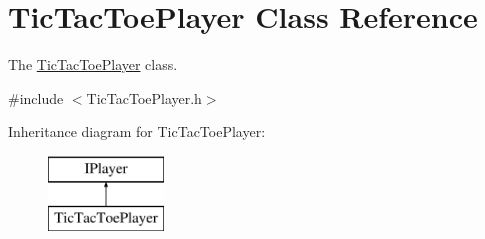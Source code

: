 \hypertarget{class_tic_tac_toe_player}{}\section{Tic\+Tac\+Toe\+Player Class Reference}
\label{class_tic_tac_toe_player}


The \hyperlink{class_tic_tac_toe_player}{Tic\+Tac\+Toe\+Player} class.  




{\ttfamily \#include $<$Tic\+Tac\+Toe\+Player.\+h$>$}

Inheritance diagram for Tic\+Tac\+Toe\+Player\+:\begin{figure}[H]
\begin{center}
\leavevmode
\includegraphics[height=2.000000cm]{class_tic_tac_toe_player}
\end{center}
\end{figure}
